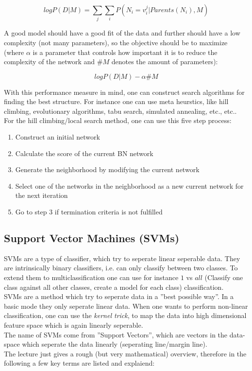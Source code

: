 \documentclass[12pt,a4paper]{article}
\begin{document}
\[log P(D|M) = \sum_j \sum_i P(N_i = v_i^j | Parents(N_i), M)\]

\noindent A good model should have a good fit of the data and further should have a low complexity (not many parameters), so the objective should be to maximize (where \(\alpha\) is a parameter that controls how important it is to reduce the complexity of the network and \(\#M\) denotes the amount of parameters):

\[log P(D|M) - \alpha \#M\]

\noindent With this performance measure in mind, one can construct search algorithms for finding the best structure. For instance one can use meta heurstics, like hill climbing, evolutionary algorithms, tabu search, simulated annealing, etc., etc..\\
For the hill climbing/local search method, one can use this five step process:
\begin{enumerate}
    \item Construct an initial network
    \item Calculate the score of the current BN network
    \item Generate the neighborhood by modifying the current network
    \item Select one of the networks in the neighborhood as a new current network for the next iteration
    \item Go to step 3 if termination criteria is not fulfilled
\end{enumerate}

\subsection{Support Vector Machines (SVMs)}

\noindent SVMs are a type of classifier, which try to seperate linear seperable data. They are intrinsically binary classifiers, i.e. can only classify between two classes. To extend them to multiclassification one can use for instance \(1\) vs \(all\) (Classify one class against all other classes, create a model for each class) classification.\\
SVMs are a method which try to seperate data in a ''best possible way''. In a basic mode they only seperate linear data. When one wants to perform non-linear classification, one can use the \textit{kernel trick}, to map the data into high dimensional feature space which is again linearly seperable.\\
The name of SVMs come from ''Support Vectors'', which are vectors in the data-space which seperate the data linearly (seperating line/margin line).\\[1em]
The lecture just gives a rough (but very mathematical) overview, therefore in the following a few key terms are listed and explaiend:
\end{document}
